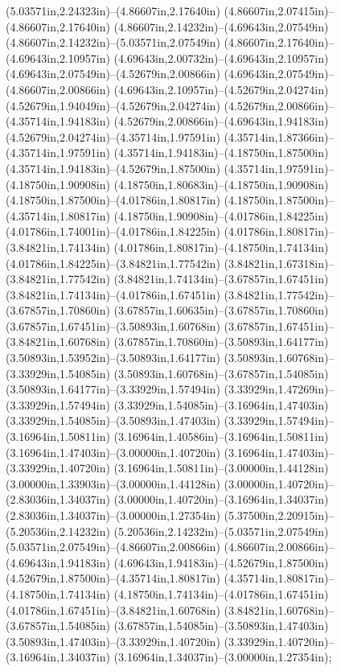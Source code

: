 (5.03571in,2.24323in)--(4.86607in,2.17640in) (4.86607in,2.07415in)--(4.86607in,2.17640in) (4.86607in,2.14232in)--(4.69643in,2.07549in) (4.86607in,2.14232in)--(5.03571in,2.07549in) (4.86607in,2.17640in)--(4.69643in,2.10957in) (4.69643in,2.00732in)--(4.69643in,2.10957in) (4.69643in,2.07549in)--(4.52679in,2.00866in) (4.69643in,2.07549in)--(4.86607in,2.00866in) (4.69643in,2.10957in)--(4.52679in,2.04274in) (4.52679in,1.94049in)--(4.52679in,2.04274in) (4.52679in,2.00866in)--(4.35714in,1.94183in) (4.52679in,2.00866in)--(4.69643in,1.94183in) (4.52679in,2.04274in)--(4.35714in,1.97591in) (4.35714in,1.87366in)--(4.35714in,1.97591in) (4.35714in,1.94183in)--(4.18750in,1.87500in) (4.35714in,1.94183in)--(4.52679in,1.87500in) (4.35714in,1.97591in)--(4.18750in,1.90908in) (4.18750in,1.80683in)--(4.18750in,1.90908in) (4.18750in,1.87500in)--(4.01786in,1.80817in) (4.18750in,1.87500in)--(4.35714in,1.80817in) (4.18750in,1.90908in)--(4.01786in,1.84225in) (4.01786in,1.74001in)--(4.01786in,1.84225in) (4.01786in,1.80817in)--(3.84821in,1.74134in) (4.01786in,1.80817in)--(4.18750in,1.74134in) (4.01786in,1.84225in)--(3.84821in,1.77542in) (3.84821in,1.67318in)--(3.84821in,1.77542in) (3.84821in,1.74134in)--(3.67857in,1.67451in) (3.84821in,1.74134in)--(4.01786in,1.67451in) (3.84821in,1.77542in)--(3.67857in,1.70860in) (3.67857in,1.60635in)--(3.67857in,1.70860in) (3.67857in,1.67451in)--(3.50893in,1.60768in) (3.67857in,1.67451in)--(3.84821in,1.60768in) (3.67857in,1.70860in)--(3.50893in,1.64177in) (3.50893in,1.53952in)--(3.50893in,1.64177in) (3.50893in,1.60768in)--(3.33929in,1.54085in) (3.50893in,1.60768in)--(3.67857in,1.54085in) (3.50893in,1.64177in)--(3.33929in,1.57494in) (3.33929in,1.47269in)--(3.33929in,1.57494in) (3.33929in,1.54085in)--(3.16964in,1.47403in) (3.33929in,1.54085in)--(3.50893in,1.47403in) (3.33929in,1.57494in)--(3.16964in,1.50811in) (3.16964in,1.40586in)--(3.16964in,1.50811in) (3.16964in,1.47403in)--(3.00000in,1.40720in) (3.16964in,1.47403in)--(3.33929in,1.40720in) (3.16964in,1.50811in)--(3.00000in,1.44128in) (3.00000in,1.33903in)--(3.00000in,1.44128in) (3.00000in,1.40720in)--(2.83036in,1.34037in) (3.00000in,1.40720in)--(3.16964in,1.34037in) (2.83036in,1.34037in)--(3.00000in,1.27354in) (5.37500in,2.20915in)--(5.20536in,2.14232in) (5.20536in,2.14232in)--(5.03571in,2.07549in) (5.03571in,2.07549in)--(4.86607in,2.00866in) (4.86607in,2.00866in)--(4.69643in,1.94183in) (4.69643in,1.94183in)--(4.52679in,1.87500in) (4.52679in,1.87500in)--(4.35714in,1.80817in) (4.35714in,1.80817in)--(4.18750in,1.74134in) (4.18750in,1.74134in)--(4.01786in,1.67451in) (4.01786in,1.67451in)--(3.84821in,1.60768in) (3.84821in,1.60768in)--(3.67857in,1.54085in) (3.67857in,1.54085in)--(3.50893in,1.47403in) (3.50893in,1.47403in)--(3.33929in,1.40720in) (3.33929in,1.40720in)--(3.16964in,1.34037in) (3.16964in,1.34037in)--(3.00000in,1.27354in);
